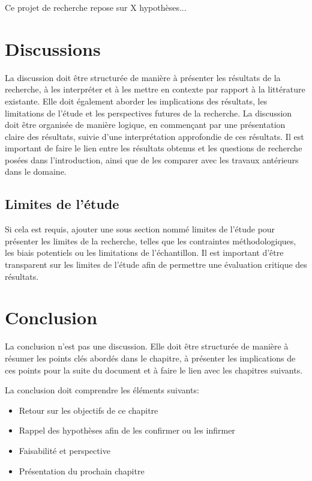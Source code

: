 Ce projet de recherche repose sur X hypothèses...

\section{Discussions}
La discussion doit être structurée de manière à présenter les résultats de la recherche, à les interpréter et à les mettre en contexte par rapport à la littérature existante. Elle doit également aborder les implications des résultats, les limitations de l'étude et les perspectives futures de la recherche.
La discussion doit être organisée de manière logique, en commençant par une présentation claire des résultats, suivie d'une interprétation approfondie de ces résultats. Il est important de faire le lien entre les résultats obtenus et les questions de recherche posées dans l'introduction, ainsi que de les comparer avec les travaux antérieurs dans le domaine.

\subsection{Limites de l'étude}
Si cela est requis, ajouter une sous section nommé limites de l'étude pour présenter les limites de la recherche, telles que les contraintes méthodologiques, les biais potentiels ou les limitations de l'échantillon. Il est important d'être transparent sur les limites de l'étude afin de permettre une évaluation critique des résultats.


\section{Conclusion}
La conclusion n'est pas une discussion. Elle doit être structurée de manière à résumer les points clés abordés dans le chapitre, à présenter les implications de ces points pour la suite du document et à faire le lien avec les chapitres suivants.

La conclusion doit comprendre les éléments suivants:
\begin{itemize}
\item Retour sur les objectifs de ce chapitre
\item Rappel des hypothèses afin de les confirmer ou les infirmer
\item Faisabilité et perspective
\item Présentation du prochain chapitre
\end{itemize}

